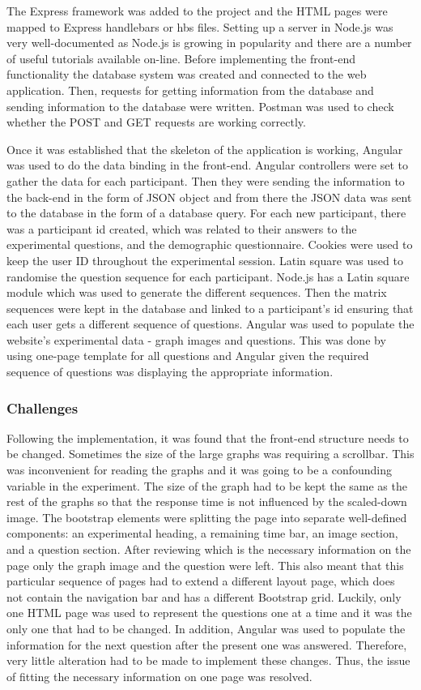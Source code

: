 \documentclass{l4proj}
\begin{document}
The Express framework was added to the project and the HTML pages were mapped to Express handlebars or hbs files. Setting up a server in Node.js was very well-documented as Node.js is growing in popularity and there are a number of useful tutorials available on-line. Before implementing the front-end functionality the database system was created and connected to the web application. Then, requests for getting information from the database and sending information to the database were written. Postman was used to check whether the POST and GET requests are working correctly. 

Once it was established that the skeleton of the application is working, Angular was used to do the data binding in the front-end. Angular controllers were set to gather the data for each participant. Then they were sending the information to the back-end in the form of JSON object and from there the JSON data was sent to the database in the form of a database query. For each new participant, there was a participant id created, which was related to their answers to the experimental questions, and the demographic questionnaire. Cookies were used to keep the user ID throughout the experimental session. Latin square was used to randomise the question sequence for each participant. Node.js has a Latin square module which was used to generate the different sequences. Then the matrix sequences were kept in the database and linked to a participant's id ensuring that each user gets a different sequence of questions. Angular was used to populate the website's experimental data - graph images and questions. This was done by using one-page template for all questions and Angular given the required sequence of questions was displaying the appropriate information. 

\subsubsection{Challenges}

Following the implementation, it was found that the front-end structure needs to be changed. Sometimes the size of the large graphs was requiring a scrollbar. This was inconvenient for reading the graphs and it was going to be a confounding variable in the experiment. The size of  the graph had to be kept the same as the rest of the graphs so that the response time is not influenced by the scaled-down image. The bootstrap elements were splitting the page into separate well-defined components: an experimental heading, a remaining time bar, an image section, and a question section. After reviewing which is the necessary information on the page only the graph image and the question were left. This also meant that this particular sequence of pages had to extend a different layout page, which does not contain the navigation bar and has a different Bootstrap grid. Luckily, only one HTML page was used to represent the questions one at a time and it was the only one that had to be changed. In addition, Angular was used to populate the information for the next question after the present one was answered. Therefore, very little alteration had to be made to implement these changes. Thus, the issue of fitting the necessary information on one page was resolved.
\end{document}
